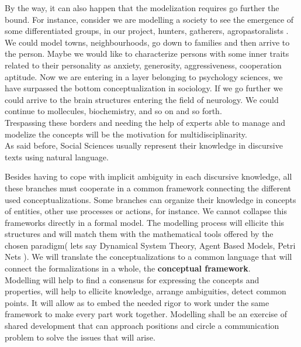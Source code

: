 \documentclass[11pt,oneside,a4paper,openright]{report}
\begin{document}
By the way, it can also happen that the modelization requires go further the bound. For instance, consider we are modelling a society to see the emergence of some differentiated groups, in our project, hunters, gatherers, agropastoralists . We could model towns, neighbourhoods, go down to families and then arrive to the person. Maybe we would like to characterize persons with some inner traits related to their personality as anxiety, generosity, aggressiveness, cooperation aptitude. Now we are entering in a layer belonging to psychology sciences, we have surpassed the bottom conceptualization in sociology. If we go further we could arrive to the brain structures entering the field of neurology. We could continue to mollecules, biochemistry, and so on and so forth.\\
Trespassing these borders and needing the help of experts able to manage and modelize the concepts will be the motivation for multidisciplinarity.\\ 
As said before, Social Sciences usually represent their knowledge in discursive texts using natural language.


Besides having to cope with implicit ambiguity in each discursive knowledge, all these branches must cooperate in a common framework connecting the different used conceptualizations. Some branches can organize their knowledge in concepts of entities, other use processes or actions, for instance. We cannot collapse this frameworks directly in a formal model. The modelling process will ellicite this structures and will match them with the mathematical tools offered by the chosen paradigm( lets say Dynamical System Theory, Agent Based Models, Petri Nets ). We will translate the conceptualizations to a common language that will connect the formalizations in a whole, the \textbf{conceptual framework}.\\
Modelling will help to find a consensus for expressing the concepts and properties, will help to ellicite knowledge, arrange ambiguities, detect common points. It will allow as to embed the needed rigor to work under the same framework to make every part work together. Modelling shall be an exercise of shared development that can approach positions and circle a communication problem to solve the issues that will arise.\\
\end{document}
